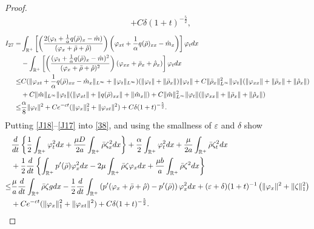\documentclass[10pt,a4paper]{amsart}
\begin{document}
\begin{proof}
\begin{align}
			&+C\delta(1+t)^{-\frac{5}{2}},
		\end{align}
		\begin{align}\label{J17}
			I_{27}
			=&\int_{\mathbb{R}^+}\left[\left(\frac{2(\varphi_t+\frac{1}{\alpha}q(\bar\rho)_x-\hat m)}{(\varphi_x+\bar\rho+\hat\rho)}\right)\left(\varphi_{xt}+\frac{1}{\alpha}q(\bar\rho)_{xx}-\hat m_x\right)\right]\varphi_t{\rm d}x\notag\\
			&-\int_{\mathbb{R}^+}\left[\left(\frac{(\varphi_t+\frac{1}{\alpha}q(\bar\rho)_x-\hat m)^2}{(\varphi_x+\bar\rho+\hat\rho)^2}\right)(\varphi_{xx}+\bar\rho_x+\hat\rho_x	)\right]\varphi_t{\rm d}x\notag\\
			\leq& C(\|\varphi_{xt}+\frac{1}{\alpha}q(\bar\rho)_{xx}-\hat m_x\|_{L^\infty}+\|\varphi_t\|_{L^\infty})(\|\varphi_t\|+\|\bar\rho_x\|)\|\varphi_t\|+C\|\bar\rho_x\|^2_{L^\infty}\|\varphi_t\|(\|\varphi_{xx}\|+\|\bar\rho_{x}\|+\|\hat \rho_x\|)\notag\\
			&+C\|\hat m\|_{L^\infty}\|\varphi_t\|(\|\varphi_{xt}\|+\|q(\bar\rho)_{xx}\|+\|\hat m_x\|)+C\|\hat m\|^2_{L^\infty}\|\varphi_t\|(\|\varphi_{xx}\|+\|\bar\rho_{x}\|+\|\hat \rho_x\|)\notag\\
			\leq& \frac{\alpha}{8}\|\varphi_t\|^2+C{\rm e}^{-ct}(\|\varphi_{x}\|_1^2+\|\varphi_{xt}\|^2)+C\delta(1+t)^{-\frac{5}{2}}.
		\end{align}
	Putting \eqref{J18}--\eqref{J17} into \eqref{38}, and using the smallness of $\varepsilon$ and $\delta$ show	
\begin{align}\label{13.43}
			&\frac{{\rm d}}{{\rm d}t}\left\{\frac{1}{2}\int_{\mathbb{R}^+}\varphi_t^2{\rm d}x	+\frac{\mu D}{2a}\int_{\mathbb{R}^+}^{}\bar\rho\zeta_x^2{\rm d}x\right\}+\frac{\alpha}{2}\int_{\mathbb{R}^+}\varphi_t^2{\rm d}x+\frac{\mu}{2a}\int_{\mathbb{R}^+}^{}\bar\rho\zeta_t^2{\rm d}x\notag\\
			&+\frac{1}{2}	\frac{{\rm d}}{{\rm d}t}\left\{\int_{\mathbb{R}^+}p^{\prime}(\bar\rho)\varphi_x^2{\rm d}x-2\mu\int_{\mathbb{R}^+}\bar\rho\zeta\varphi_x{\rm d}x+\frac{\mu b}{a}\int_{\mathbb{R}^+}^{}\bar\rho\zeta^2{\rm d}x\right\}\notag\\
			\leq &\frac{\mu}{a}\frac{{\rm d}}{{\rm d}t}\int_{\mathbb{R}^+}\bar\rho\zeta g{\rm d}x-\frac{1}{2}	\frac{{\rm d}}{{\rm d}t}\int_{\mathbb{R}^+}\left(p^{\prime}(\varphi_x+\bar\rho+\hat\rho)-p^{\prime}(\bar\rho)\right)\varphi_x^2{\rm d}x+(\varepsilon+\delta)(1+t)^{-1}\left(\|\varphi_x\|^2+\|\zeta\|_1^2\right)\notag\\ 
			&+C{\rm e}^{-ct}(\|\varphi_{x}\|_1^2+\|\varphi_{xt}\|^2)+C\delta(1+t)^{-\frac{5}{2}}.

\end{align}
\end{proof}
\end{document}

